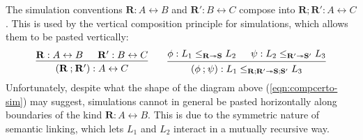 \documentclass[acmsmall,screen,review,anonymous]{acmart}
\begin{document}

The simulation conventions $\mathbf{R} : A \leftrightarrow B$ and
$\mathbf{R}' : B \leftrightarrow C$
compose into
$\mathbf{R} \mathbin; \mathbf{R}' : A \leftrightarrow C$.
This is used by the vertical composition principle for simulations,
which allows them to be pasted vertically:
\[
  \begin{prooftree}
    \hypo{\mathbf{R} : A \leftrightarrow B}
    \hypo{\mathbf{R}' : B \leftrightarrow C}
    \infer2{(\mathbf{R} \mathbin; \mathbf{R}') : A \leftrightarrow C}
  \end{prooftree}
  \qquad
  \begin{prooftree}
    \hypo{\phi : L_1 \le_{\mathbf{R} \twoheadrightarrow \mathbf{S}} L_2}
    \hypo{\psi : L_2 \le_{\mathbf{R'} \twoheadrightarrow \mathbf{S'}} L_3}
    \infer2{(\phi \mathbin; \psi) : L_1 \le_{\mathbf{R} \mathbin; \mathbf{R'} \twoheadrightarrow
      \mathbf{S} \mathbin; \mathbf{S'}} L_3}
  \end{prooftree}
\]
Unfortunately,
despite what the shape of the diagram above (\ref{eqn:compcerto-sim}) may suggest,
simulations cannot in general be pasted horizontally
along boundaries of the kind $\mathbf{R} : A \leftrightarrow B$.
This is due to the symmetric nature of semantic linking,
which lets $L_1$ and $L_2$ interact in a mutually recursive way.
\end{document}

